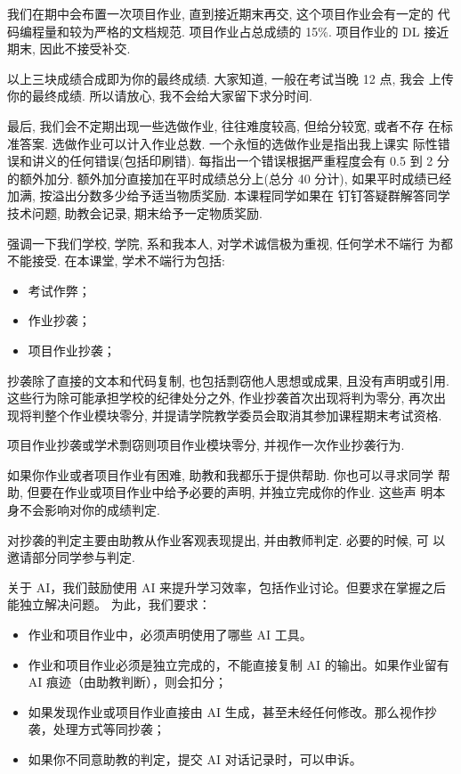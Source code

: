\documentclass[a4paper]{ctexart}
\begin{document}
我们在期中会布置一次项目作业, 直到接近期末再交, 这个项目作业会有一定的
代码编程量和较为严格的文档规范. 项目作业占总成绩的 15\%. 项目作业的 DL
接近期末, 因此不接受补交. 

以上三块成绩合成即为你的最终成绩. 大家知道, 一般在考试当晚 12 点, 我会
上传你的最终成绩. 所以请放心, 我不会给大家留下求分时间.

最后, 我们会不定期出现一些选做作业, 往往难度较高, 但给分较宽, 或者不存
在标准答案. 选做作业可以计入作业总数. 一个永恒的选做作业是指出我上课实
际性错误和讲义的任何错误(包括印刷错). 每指出一个错误根据严重程度会有
0.5 到 2 分的额外加分. 额外加分直接加在平时成绩总分上(总分 40 分计),
如果平时成绩已经加满, 按溢出分数多少给予适当物质奖励. 本课程同学如果在
钉钉答疑群解答同学技术问题, 助教会记录, 期末给予一定物质奖励.

强调一下我们学校, 学院, 系和我本人, 对学术诚信极为重视, 任何学术不端行
为都不能接受. 在本课堂, 学术不端行为包括:

\begin{itemize}
\item 考试作弊；
\item 作业抄袭；
\item 项目作业抄袭；
\end{itemize}

抄袭除了直接的文本和代码复制, 也包括剽窃他人思想或成果, 
且没有声明或引用. 这些行为除可能承担学校的纪律处分之外, 
作业抄袭首次出现将判为零分, 再次出现将判整个作业模块零分, 
并提请学院教学委员会取消其参加课程期末考试资格.

项目作业抄袭或学术剽窃则项目作业模块零分, 并视作一次作业抄袭行为.

如果你作业或者项目作业有困难, 助教和我都乐于提供帮助. 你也可以寻求同学
帮助, 但要在作业或项目作业中给予必要的声明, 并独立完成你的作业. 这些声
明本身不会影响对你的成绩判定.

对抄袭的判定主要由助教从作业客观表现提出, 并由教师判定. 必要的时候, 可
以邀请部分同学参与判定. %

关于 AI，我们鼓励使用 AI 来提升学习效率，包括作业讨论。但要求在掌握之后能独立解决问题。
为此，我们要求：
\begin{itemize}
  \item 作业和项目作业中，必须声明使用了哪些 AI 工具。
  \item 作业和项目作业必须是独立完成的，不能直接复制 AI 的输出。如果作业留有 AI 痕迹（由助教判断），则会扣分；
  \item 如果发现作业或项目作业直接由 AI 生成，甚至未经任何修改。那么视作抄袭，处理方式等同抄袭；
  \item 如果你不同意助教的判定，提交 AI 对话记录时，可以申诉。
\end{itemize}
\end{document}
